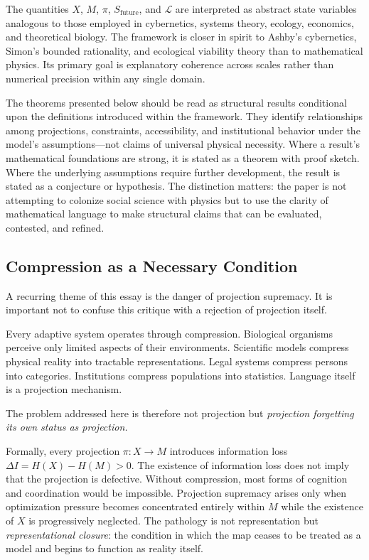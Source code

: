 \documentclass[12pt, a4paper]{article}
\theoremstyle{plain}
\theoremstyle{definition}
\theoremstyle{remark}
\begin{document}
The quantities $X$, $M$, $\pi$, $S_{\mathrm{future}}$, and $\mathcal{L}$
are interpreted as abstract state variables analogous to those employed in
cybernetics, systems theory, ecology, economics, and theoretical biology.
The framework is closer in spirit to Ashby's cybernetics, Simon's bounded rationality,
and ecological viability theory than to mathematical physics.
Its primary goal is explanatory coherence across scales rather than numerical
precision within any single domain.

The theorems presented below should be read as structural results conditional upon
the definitions introduced within the framework.
They identify relationships among projections, constraints, accessibility, and
institutional behavior under the model's assumptions---not claims of universal
physical necessity.
Where a result's mathematical foundations are strong, it is stated as a theorem
with proof sketch.
Where the underlying assumptions require further development, the result is stated
as a conjecture or hypothesis.
The distinction matters: the paper is not attempting to colonize social science
with physics but to use the clarity of mathematical language to make structural
claims that can be evaluated, contested, and refined.

\subsection*{Compression as a Necessary Condition}

A recurring theme of this essay is the danger of projection supremacy.
It is important not to confuse this critique with a rejection of projection itself.

Every adaptive system operates through compression.
Biological organisms perceive only limited aspects of their environments.
Scientific models compress physical reality into tractable representations.
Legal systems compress persons into categories.
Institutions compress populations into statistics.
Language itself is a projection mechanism.

The problem addressed here is therefore not projection but \emph{projection forgetting
its own status as projection.}

Formally, every projection $\pi : X \to M$ introduces information loss
$\Delta I = H(X) - H(M) > 0$.
The existence of information loss does not imply that the projection is defective.
Without compression, most forms of cognition and coordination would be impossible.
Projection supremacy arises only when optimization pressure becomes concentrated
entirely within $M$ while the existence of $X$ is progressively neglected.
The pathology is not representation but \emph{representational closure}: the condition
in which the map ceases to be treated as a model and begins to function as reality itself.
\end{document}
